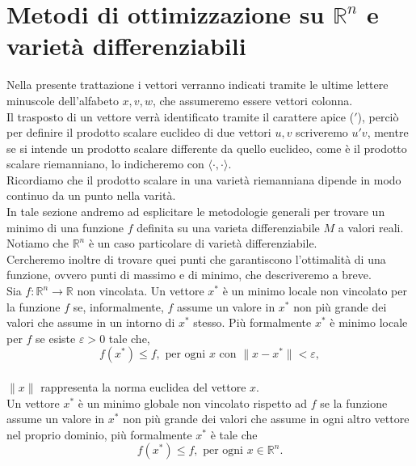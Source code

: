 \documentclass[a4paper, 12pt]{article}
\begin{document}
\section{Metodi di ottimizzazione su $\mathbb{R}^n$ e varietà differenziabili}
Nella presente trattazione i vettori verranno indicati tramite le ultime lettere minuscole dell'alfabeto $x, v, w$, che assumeremo essere vettori colonna.\\
Il trasposto di un vettore verrà identificato tramite il carattere apice ($'$), perciò per definire il prodotto scalare euclideo di due vettori $u, v$ scriveremo $u'v$, mentre se si intende  un prodotto scalare differente da quello euclideo, come è il prodotto scalare riemanniano, lo indicheremo con $\langle \cdot,\cdot \rangle$.\\
Ricordiamo che il prodotto scalare in una varietà riemanniana dipende in modo continuo da un punto nella varità.\\
In tale sezione andremo ad esplicitare le metodologie generali per trovare un minimo di una funzione $f$ definita su una varieta differenziabile $M$ a valori reali.\\
Notiamo che $\mathbb{R}^n$ è un caso particolare di varietà differenziabile.\\
Cercheremo inoltre di trovare quei punti che garantiscono l'ottimalità di una funzione, ovvero punti di massimo e di minimo, che descriveremo a breve.\\
Sia $f: \mathbb{R} ^n \to \mathbb{R}$ non vincolata.
Un vettore $x^\ast$ è un minimo locale non vincolato per la funzione $f$ se, informalmente, $f$ assume un valore in $x^\ast$ non più grande dei valori che assume in un intorno di $x^\ast$ stesso. Più formalmente $x^\ast$ è minimo locale per $f$ se esiste $\varepsilon > 0$ tale che,\\
\[f(x^\ast) \leq f, \mbox{ per ogni } x \mbox{ con } \| x - x^\ast \| < \varepsilon,\]\\
$\| x \|$ rappresenta la norma euclidea del vettore $x$.\\
Un vettore $x^\ast$ è un minimo globale non vincolato rispetto ad $f$ se la funzione assume un valore in $x^\ast$ non più grande dei valori che assume in ogni altro vettore nel proprio dominio, più formalmente $x^\ast$ è tale che\\
\[f(x^\ast) \leq f, \mbox{ per ogni } x \in \mathbb{R}^n.\]\\
\end{document}

